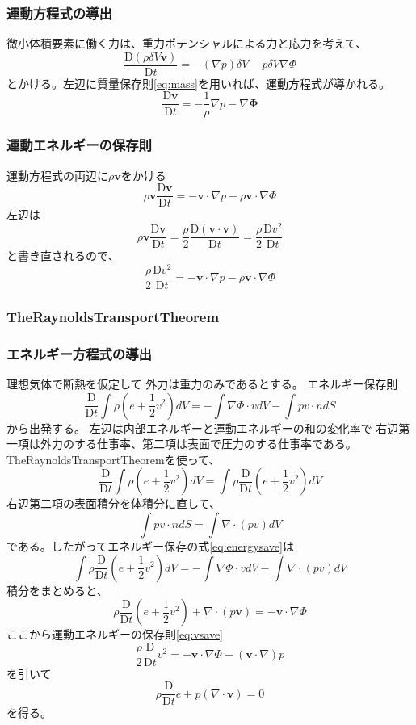 \documentclass[a4j, dvipdfmx]{jsarticle}
\newcommand{\bv}{\mathbf{v}}
\newcommand{\Dder}[2][]{\frac{\mathrm{D}#1}{\mathrm{D}#2}}
\newcommand{\half}{\frac{1}{2}}
\newcommand{\beq}{\begin{equation}}
\newcommand{\eeq}{\end{equation}}
\begin{document}
\subsubsection{運動方程式の導出}
微小体積要素に働く力は、重力ポテンシャルによる力と応力を考えて、
\begin{equation}
     \Dder[(\rho \delta V \bv)]{t} = - (\nabla p) \delta V - p \delta V \nabla \Phi
\end{equation}
とかける。左辺に質量保存則\eqref{eq:mass}を用いれば、運動方程式が導かれる。
\begin{equation}
    \Dder[\bv]{t} = - \frac{1}{\rho}\nabla p - \nabla\mathbf{\Phi}
\end{equation}
\subsubsection{運動エネルギーの保存則}
運動方程式の両辺に$\rho\bv$をかける
\beq
    \rho\bv\Dder[\bv]{t} = - \bv\cdot\nabla{p} - \rho\bv\cdot\nabla\Phi
\eeq
左辺は
\beq
\rho\bv\Dder[\bv]{t} = \frac{\rho}{2}\Dder[(\bv \cdot \bv)]{t}= \frac{\rho}{2} \Dder[v^2]{t}
\eeq
と書き直されるので、
\beq
\frac{\rho}{2} \Dder[v^2]{t}= - \bv\cdot\nabla{p} - \rho\bv\cdot\nabla\Phi\label{eq:vsave}
\eeq
\subsubsection{TheRaynoldsTransportTheorem}
\subsubsection{エネルギー方程式の導出}
理想気体で断熱を仮定して
外力は重力のみであるとする。
エネルギー保存則
\beq
\Dder[]{t} \int \rho(e + \half v^2) dV = - \int \nabla\Phi \cdot v dV - \int pv \cdot n dS\label{eq:energysave}
\eeq
から出発する。
左辺は内部エネルギーと運動エネルギーの和の変化率で
右辺第一項は外力のする仕事率、第二項は表面で圧力のする仕事率である。
TheRaynoldsTransportTheoremを使って、
\beq
\Dder[]{t} \int \rho(e + \half v^2) dV  = \int \rho \Dder[]{t} (e + \half v^2)dV   
\eeq    
右辺第二項の表面積分を体積分に直して、
\beq
\int pv \cdot n dS = \int \nabla \cdot (pv) dV
\eeq
である。したがってエネルギー保存の式\eqref{eq:energysave}は
\beq
\int \rho \Dder[]{t} (e + \half v^2)dV =-\int \nabla\Phi\cdot v dV -  \int \nabla \cdot (pv) dV
\eeq
積分をまとめると、
\beq
    \rho \Dder[]{t} (e + \half v^2) + \nabla \cdot (p\bv) = - \bv\cdot \nabla\Phi
\eeq
ここから運動エネルギーの保存則\eqref{eq:vsave}
\beq
\frac{\rho}{2} \Dder[]{t} v^2 = -\bv \cdot \nabla\Phi - (\bv \cdot \nabla) p
\eeq
を引いて
\beq
    \rho \Dder[]{t} e + p (\nabla \cdot \bv) = 0
\eeq
を得る。
\end{document}
